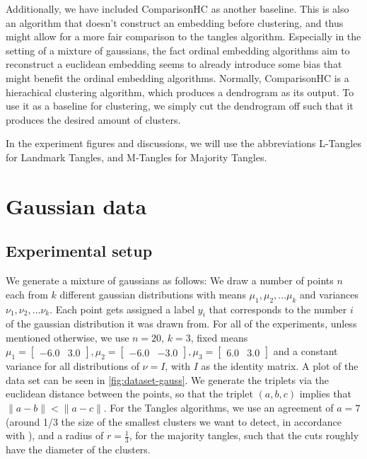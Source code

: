 Additionally, we have included ComparisonHC \citep{ghoshdastidarFoundationsComparisonBasedHierarchical2019} as another baseline. This is also an algorithm that doesn't
construct an embedding before clustering, and thus might allow for a more fair comparison to the tangles algorithm. Especially in the setting of a mixture of gaussians, 
the fact ordinal embedding algorithms aim to reconstruct a euclidean embedding seems to already introduce some bias that might benefit the ordinal embedding algorithms.
Normally, ComparisonHC is a hierachical clustering algorithm, which produces a dendrogram as its output. To use it as a baseline for clustering, we simply
cut the dendrogram off such that it produces the desired amount of clusters.

In the experiment figures and discussions, we will  use the abbreviations L-Tangles for Landmark Tangles, and M-Tangles for Majority Tangles.

\section{Gaussian data}\label{sec:gaussian_data}
\subsection{Experimental setup}
We generate a mixture of gaussians as follows: We draw a number of points $n$ each from $k$ different gaussian distributions with means $\mu_1, \mu_2, \ldots \mu_k$ and 
variances $\nu_1, \nu_2, \ldots \nu_k$. Each point gets assigned a label $y_i$ that corresponds to the number $i$ of the gaussian distribution it was drawn from.
For all of the experiments, unless mentioned otherwise, we use $n=20$, $k=3$, fixed means $\mu_1 = \begin{bmatrix} -6.0 & 3.0 \end{bmatrix}, 
\mu_2 = \begin{bmatrix} -6.0 & -3.0 \end{bmatrix},  \mu_3 = \begin{bmatrix} 6.0 & 3.0 \end{bmatrix}$ and a constant variance for all distributions of $\nu = I$, 
with $I$ as the identity matrix. A plot of the data set can be seen in \autoref{fig:dataset-gauss}. We generate the triplets via the euclidean distance between the points, so that
the triplet $(a,b,c)$ implies that $\|a - b\| < \|a - c\|$. For the Tangles algorithms, we use an agreement of $a=7$ (around 1/3 the size of the smallest
clusters we want to detect, in accordance with \cite{klepperClusteringTanglesAlgorithmic2021}), and a radius of $r=\frac{1}{3}$, for the majority
tangles, such that the cuts roughly have the diameter of the clusters.

